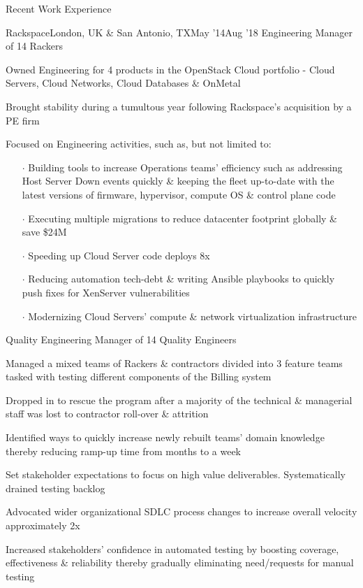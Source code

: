 \documentclass{resume} %
\begin{document}
\begin{rSection}{Recent Work Experience}
\begin{rSubsection}{Rackspace}{London, UK \& San Antonio, TX}{May '14}{Aug '18}
  {Engineering Manager of 14 Rackers}
  \item Owned Engineering for 4 products in the OpenStack Cloud portfolio - Cloud Servers, Cloud Networks, Cloud Databases \& OnMetal
  \item Brought stability during a tumultous year following Rackspace's acquisition by a PE firm
  \item Focused on Engineering activities, such as, but not limited to:
    \vspace{-0.5em}
    \begin{itemize}  \itemsep0.5pt \parskip0pt
    \item[$\cdot$] Building tools to increase Operations teams' efficiency such as addressing Host Server Down events quickly \& keeping the fleet up-to-date with the latest versions of firmware, hypervisor, compute OS \& control plane code
    \item[$\cdot$] Executing multiple migrations to reduce datacenter footprint globally \& save \$24M
    \item[$\cdot$] Speeding up Cloud Server code deploys 8x
    \item[$\cdot$] Reducing automation tech-debt \& writing Ansible playbooks to quickly push fixes for XenServer vulnerabilities
    \item[$\cdot$] Modernizing Cloud Servers' compute \& network virtualization infrastructure
    \end{itemize}
\end{rSubsection}\vspace{-1em}

  
\begin{rSubsection}{}{}{}{}
{Quality Engineering Manager of 14 Quality Engineers}
  \item Managed a mixed teams of Rackers \& contractors divided into 3 feature teams tasked with testing different components of the Billing system
\item Dropped in to rescue the program after a majority of the technical \& managerial staff was lost to contractor roll-over \& attrition
\item Identified ways to quickly increase newly rebuilt teams' domain knowledge thereby reducing ramp-up time from months to a week
\item Set stakeholder expectations to focus on high value deliverables. Systematically drained testing backlog
\item Advocated wider organizational SDLC process changes to increase overall velocity approximately 2x
\item Increased stakeholders' confidence in automated testing by boosting coverage, effectiveness \& reliability thereby gradually eliminating need/requests for manual testing
  

\end{rSubsection}
\end{rSection}
\end{document}
